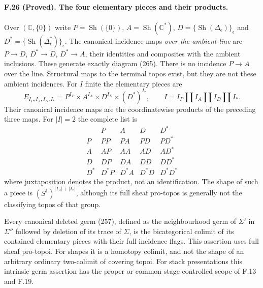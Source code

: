 \paragraph{F.26 (Proved). The four elementary pieces and their products.}
Over $(\mathbb C,\{0\})$ write
$P=\operatorname{Sh}(\{0\})$, $A=\operatorname{Sh}(\mathbb C^*)$,
$D=\{\operatorname{Sh}(\Delta_\epsilon)\}_\epsilon$ and
$D^*=\{\operatorname{Sh}(\Delta_\epsilon^*)\}_\epsilon$.
The canonical incidence maps \emph{over the ambient line} are
$P\to D$, $D^*\to D$, $D^*\to A$, their identities and composites
with the ambient inclusions. These generate exactly diagram (265).
There is no incidence $P\to A$ over the line. Structural maps to
the terminal topos exist, but they are not these ambient incidences.
For $I$ finite the elementary pieces are
\[
 E_{I_P,I_A,I_D,I_*}
 =P^{I_P}\times A^{I_A}\times D^{I_D}\times(D^*)^{I_*},
 \qquad I=I_P\amalg I_A\amalg I_D\amalg I_*.
\]
Their canonical incidence maps are the coordinatewise products of
the preceding three maps. For $|I|=2$ the complete list is
\[
\begin{array}{c|cccc}
 &P&A&D&D^*\\ \hline
 P&P P&P A&P D&P D^*\\
 A&A P&A A&A D&A D^*\\
 D&D P&D A&D D&D D^*\\
 D^*&D^*P&D^*A&D^*D&D^*D^*
\end{array}
\]
where juxtaposition denotes the product, not an identification.
The shape of such a piece is $(S^1)^{|I_A|+|I_*|}$, although its
full sheaf pro-topos is generally not the classifying topos of that
group.

Every canonical deleted germ (257), defined as the neighbourhood
germ of $\Sigma'$ in $\Sigma''$ followed by deletion of its trace
of $\Sigma$, is the bicategorical colimit of its contained elementary
pieces with their full incidence flags. This assertion uses full
sheaf pro-topoi. For shapes it is a homotopy colimit, and not the
shape of an arbitrary ordinary two-colimit of covering topoi.
For stack presentations this intrinsic-germ assertion has the proper
or common-stage controlled scope of F.13 and F.19.

